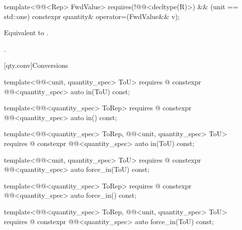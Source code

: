 \begin{itemdecl}
template<@@<Rep> FwdValue>
  requires(!@@<decltype(R)>) && (unit == std::one)
constexpr quantity& operator=(FwdValue&& v);
\end{itemdecl}

\begin{itemdescr}
\pnum
\effects
Equivalent to .

\pnum
\returns
{}.
\end{itemdescr}

[qty.conv]{Conversions}

\begin{itemdecl}
template<@@<unit, quantity_spec> ToU>
  requires @\seebelownc@
constexpr @@<quantity_spec> auto in(ToU) const;

template<@@<quantity_spec> ToRep>
  requires @\seebelownc@
constexpr @@<quantity_spec> auto in() const;

template<@@<quantity_spec> ToRep,
         @@<unit, quantity_spec> ToU>
  requires @\seebelownc@
constexpr @@<quantity_spec> auto in(ToU) const;

template<@@<unit, quantity_spec> ToU>
  requires @\seebelownc@
constexpr @@<quantity_spec> auto force_in(ToU) const;

template<@@<quantity_spec> ToRep>
  requires @\seebelownc@
constexpr @@<quantity_spec> auto force_in() const;

template<@@<quantity_spec> ToRep,
         @@<unit, quantity_spec> ToU>
  requires @\seebelownc@
constexpr @@<quantity_spec> auto force_in(ToU) const;
\end{itemdecl}

